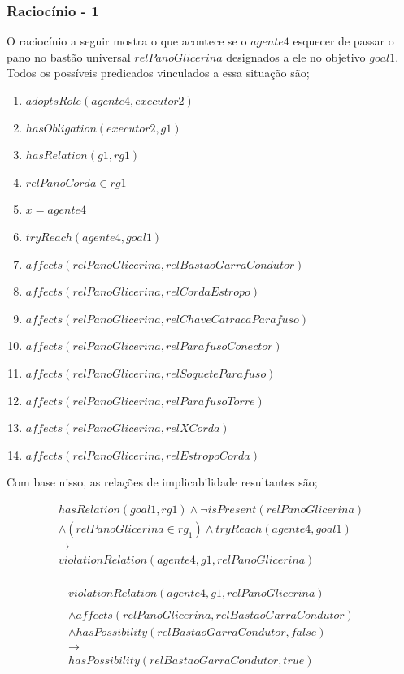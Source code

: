 \documentclass[12pt]{article}
\begin{document}
\subsubsection{Raciocínio - 1} 


O raciocínio a seguir mostra o que acontece se o $agente4$ esquecer de passar o pano no bastão universal $relPanoGlicerina$ designados a ele no objetivo $goal1$. Todos os possíveis predicados vinculados a essa situação são;

\begin{enumerate}
	\item $adoptsRole(agente4,executor2)$ 
	\item $hasObligation(executor2,g1)$
	\item $hasRelation(g1,rg1)$ 
	\item $relPanoCorda \in rg1$
	\item $ x = agente4 $
	\item $tryReach(agente4,goal1)$
	\item $affects(relPanoGlicerina,relBastaoGarraCondutor)$
	\item $affects(relPanoGlicerina,relCordaEstropo)$  
	\item $affects(relPanoGlicerina,relChaveCatracaParafuso)$
	\item $affects(relPanoGlicerina,relParafusoConector)$ 
	\item $affects(relPanoGlicerina,relSoqueteParafuso)$ 
	\item $affects(relPanoGlicerina,relParafusoTorre)$
	\item $affects(relPanoGlicerina,relXCorda)$ 
	\item $affects(relPanoGlicerina,relEstropoCorda)$	
\end{enumerate}

Com base nisso, as relações de implicabilidade resultantes são;

\begin{eqnarray}\nonumber
	hasRelation(goal1,rg1)\wedge \neg isPresent(relPanoGlicerina)  \nonumber \\ 
	\wedge (relPanoGlicerina\in rg_1) \wedge tryReach(agente4,goal1) \nonumber \\ 
	\to \nonumber \\ 
	violationRelation(agente4,g1,relPanoGlicerina) \nonumber \\	
\end{eqnarray}

\begin{eqnarray}\nonumber
	violationRelation(agente4,g1,relPanoGlicerina)  \nonumber \\ 
	\nonumber \\ 
	\wedge affects(relPanoGlicerina,relBastaoGarraCondutor)   \nonumber \\ 
	\wedge hasPossibility(relBastaoGarraCondutor,false) \nonumber \\  
	\to \nonumber \\  
	hasPossibility(relBastaoGarraCondutor,true) 
\end{eqnarray}
\end{document}

